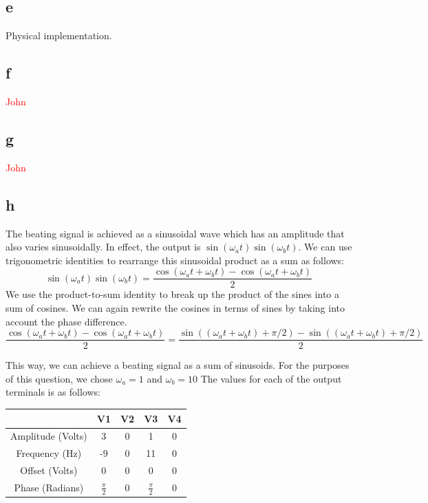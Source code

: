 \documentclass{article}
\newcommand{\xxx}[1]{\textcolor{red}{#1}}
\theoremstyle{plain}
\theoremstyle{definition}
\theoremstyle{remark}
\begin{document}
\subsection*{e} Physical implementation.

\subsection*{f} \xxx{John}

\subsection*{g} \xxx{John}

\subsection*{h} 
The beating signal is achieved as a sinusoidal wave which has an amplitude that also varies sinusoidally. In effect, the output is $\sin(\omega_a t)\sin(\omega_b t) $. We can use trigonometric identities to rearrange this sinusoidal product as a sum as follows:
$$\sin(\omega_a t)\sin(\omega_b t) = \frac{\cos(\omega_a t + \omega_b t) - \cos(\omega_a t + \omega_b t)}{2}$$
We use the product-to-sum identity to break up the product of the sines into a sum of cosines. We can again rewrite the cosines in terms of sines by taking into account the phase difference.
$$\frac{\cos(\omega_a t + \omega_b t) - \cos(\omega_a t + \omega_b t)}{2} = \frac{\sin((\omega_a t + \omega_b t) + \pi/2)- \sin((\omega_a t + \omega_b t) + \pi/2)}{2}$$

This way, we can achieve a beating signal as a sum of sinusoids. For the purposes of this question, we chose $\omega_a = 1$ and $\omega_b = 10$ The values for each of the output terminals is as follows:
\begin{table}[h]
\begin{center}
    \begin{tabular}{|c||c|c|c|c|}
        \hline
        ~                 & V1              & V2 & V3              & V4 \\ \hline \hline
        Amplitude (Volts) & 3               & 0  & 1               & 0  \\ \hline
        Frequency (Hz)    & -9              & 0  & 11              & 0  \\ \hline
        Offset (Volts)    & 0               & 0  & 0               & 0  \\ \hline
        Phase (Radians)            & $\frac{\pi}{2}$ & 0  & $\frac{\pi}{2}$ & 0  \\
        \hline
    \end{tabular}
\end{center}
\end{table}
\end{document}

